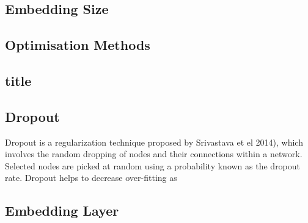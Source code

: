 \subsection{Embedding Size}
\subsection{Optimisation Methods}
\subsection{title}
\subsection{Dropout}
Dropout is a regularization technique proposed by Srivastava et el 2014), which involves the random dropping of nodes and their connections within a network. Selected nodes are picked at random using a probability known as the dropout rate. Dropout helps to decrease over-fitting as 
\subsection{Embedding Layer}

